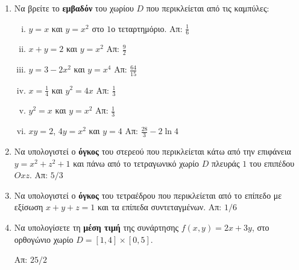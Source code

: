 \begin{enumerate}
  \item Να βρείτε το \textbf{εμβαδόν} του χωρίου $D$ που περικλείεται από τις καμπύλες: 
    \begin{enumerate}[i)]
      \item $y=x$ και $y=x^2$ στο $1$ο τεταρτημόριο. \hfill Απ: $\frac{1}{6}$
      \item $x+y=2$ και $y=x^2$ \hfill Απ: $\frac{9}{2}$
      \item $y=3-2x^2$ και $y=x^4$ \hfill Απ: $\frac{64}{15}$
      \item $x=\frac{1}{4}$ και $y^2=4x$ \hfill Απ: $\frac{1}{3}$ %
      \item $y^2=x$ και $y=x^2$ \hfill Απ: $\frac{1}{3}$ %
      \item $xy=2$, $4y=x^2$ και $y=4$ \hfill Απ: $\frac{28}{3}-2\ln 4$ 
    \end{enumerate}

  \item Να υπολογιστεί ο \textbf{όγκος} του στερεού που περικλείεται κάτω από 
    την επιφάνεια $y=x^2+z^2+1$ και πάνω από το τετραγωνικό χωρίο $D$ πλευράς $1$ 
    του επιπέδου $Oxz$.
    \hfill Απ: ${5}/{3}$ %

  \item Να υπολογιστεί ο \textbf{όγκος} του τετραέδρου που περικλείεται από το 
    επίπεδο με εξίσωση $x+y+z=1$ και τα επίπεδα συντεταγμένων.  
    \hfill Απ: ${1}/{6}$ %


  \item Να υπολογίσετε τη \textbf{μέση τιμή} της συνάρτησης $ f(x,y)=2x+3y $, στο 
    ορθογώνιο χωρίο $D= [1,4] \times [0,5]$.

    \hfill Απ: $ {25}/{2} $ 
\end{enumerate}


\begin{center}
  \minibox{\large\bf \textcolor{Col1}{Υποδείξεις}}
\end{center}

\vspace{\baselineskip}

